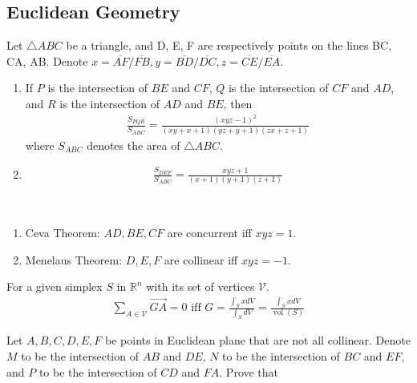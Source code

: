 \documentclass{treatise}
\begin{document}
\newpage

\begin{shaded}
\chapter{Euclidean Geometry}
\begin{theorem}
Let $\triangle ABC$ be a triangle, and D, E, F are respectively points on the lines BC, CA, AB. Denote $x = \overline{AF}/\overline{FB}, y = \overline{BD}/\overline{DC}, z = \overline{CE}/\overline{EA}$.
\begin{enumerate}
	\item If $P$ is the intersection of $BE$ and $CF$, $Q$ is the intersection of $CF$ and $AD$, and $R$ is the intersection of $AD$ and $BE$, then
	\begin{align*}
	\frac{S_{PQR}}{S_{ABC}} = \frac{(xyz - 1)^2}{(xy + x + 1)(yz + y + 1)(zx + z + 1)}
	\end{align*}
	where $S_{ABC}$ denotes the area of $\triangle ABC$.
	\item
	\begin{align*}
	\frac{S_{DEF}}{S_{ABC}} = \frac{xyz + 1}{(x + 1)(y + 1)(z + 1)}
	\end{align*}
\end{enumerate}
\end{theorem}
\begin{corollary} \ 
\begin{enumerate}
	\item Ceva Theorem: $AD, BE, CF$ are concurrent iff $xyz = 1$.
	\item Menelaus Theorem: $D, E, F$ are collinear iff $xyz = -1$.
\end{enumerate}
\end{corollary}
\begin{proposition}
For a given simplex $S$ in $\mathbb{R}^n$ with its set of vertices $\mathcal{V}$.
\begin{align*}
\sum_{A \in \mathcal{V}} \vec{GA} = 0 \mbox{ iff } G = \frac{\int_S x dV}{\int_S dV} = \frac{\int_S x dV}{\operatorname{vol}(S)}
\end{align*}
\end{proposition}
\begin{theorem}
Let $A, B, C, D, E, F$ be points in Euclidean plane that are not all collinear. Denote $M$ to be the intersection of $AB$ and $DE$, $N$ to be the intersection of $BC$ and $EF$, and $P$ to be the intersection of $CD$ and $FA$. Prove that
\begin{enumerate}

\end{enumerate}
\end{theorem}
\end{shaded}
\end{document}
